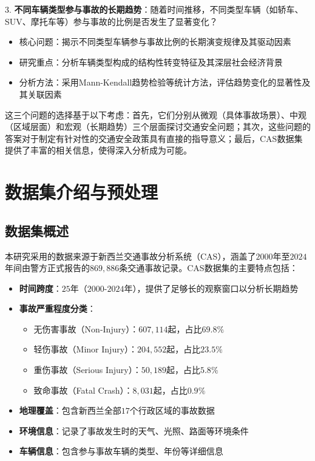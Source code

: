 \documentclass[12pt,a4paper]{article}
\begin{document}
3. \textbf{不同车辆类型参与事故的长期趋势}：随着时间推移，不同类型车辆（如轿车、SUV、摩托车等）参与事故的比例是否发生了显著变化？
   \begin{itemize}
   \item 核心问题：揭示不同类型车辆参与事故比例的长期演变规律及其驱动因素
   \item 研究重点：分析车辆类型构成的结构性转变特征及其深层社会经济背景
   \item 分析方法：采用Mann-Kendall趋势检验等统计方法，评估趋势变化的显著性及其关联因素
   \end{itemize}

这三个问题的选择基于以下考虑：首先，它们分别从微观（具体事故场景）、中观（区域层面）和宏观（长期趋势）三个层面探讨交通安全问题；其次，这些问题的答案对于制定有针对性的交通安全政策具有直接的指导意义；最后，CAS数据集提供了丰富的相关信息，使得深入分析成为可能。

\section{数据集介绍与预处理}

\subsection{数据集概述}

本研究采用的数据来源于新西兰交通事故分析系统（CAS），涵盖了$2000$年至$2024$年间由警方正式报告的$869,886$条交通事故记录。CAS数据集的主要特点包括：

\begin{itemize}
\item \textbf{时间跨度}：$25$年（$2000$-$2024$年），提供了足够长的观察窗口以分析长期趋势
\item \textbf{事故严重程度分类}：
  \begin{itemize}
  \item 无伤害事故（Non-Injury）：$607,114$起，占比$69.8\%$
  \item 轻伤事故（Minor Injury）：$204,552$起，占比$23.5\%$
  \item 重伤事故（Serious Injury）：$50,189$起，占比$5.8\%$
  \item 致命事故（Fatal Crash）：$8,031$起，占比$0.9\%$
  \end{itemize}
\item \textbf{地理覆盖}：包含新西兰全部$17$个行政区域的事故数据
\item \textbf{环境信息}：记录了事故发生时的天气、光照、路面等环境条件
\item \textbf{车辆信息}：包含参与事故车辆的类型、年份等详细信息
\end{itemize}
\end{document}
